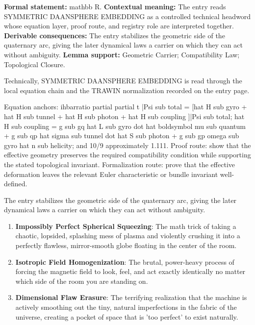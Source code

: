 \begingroup\footnotesize\setlength{\emergencystretch}{3em}\sloppy
\textbf{Formal statement:} mathbb R. \textbf{Contextual meaning:} The entry reads SYMMETRIC DAANSPHERE EMBEDDING as a controlled technical headword whose equation layer, proof route, and registry role are interpreted together. \textbf{Derivable consequences:} The entry stabilizes the geometric side of the quaternary arc, giving the later dynamical laws a carrier on which they can act without ambiguity. \textbf{Lemma support:} Geometric Carrier; Compatibility Law; Topological Closure.\par
\endgroup

Technically, SYMMETRIC DAANSPHERE EMBEDDING is read through the local equation chain and the TRAWIN normalization recorded on the entry page.

Equation anchors: ihbarratio partial partial t |Psi sub total = [hat H sub gyro + hat H sub tunnel + hat H sub photon + hat H sub coupling ]|Psi sub total; hat H sub coupling = g sub gq hat L sub gyro dot hat boldsymbol mu sub quantum + g sub qp hat sigma sub tunnel dot hat S sub photon + g sub gp omega sub gyro hat n sub helicity; and 10/9 approximately 1.111. Proof route: show that the effective geometry preserves the required compatibility condition while supporting the stated topological invariant. Formalization route: prove that the effective deformation leaves the relevant Euler characteristic or bundle invariant well-defined.

The entry stabilizes the geometric side of the quaternary arc, giving the later dynamical laws a carrier on which they can act without ambiguity.
\endgroup

\begin{enumerate}[leftmargin=1.6em,itemsep=6pt,topsep=4pt]
\item \textbf{Impossibly Perfect Spherical Squeezing}: The math trick of taking a chaotic, lopsided, splashing mess of plasma and violently crushing it into a perfectly flawless, mirror-smooth globe floating in the center of the room.
\item \textbf{Isotropic Field Homogenization}: The brutal, power-heavy process of forcing the magnetic field to look, feel, and act exactly identically no matter which side of the room you are standing on.
\item \textbf{Dimensional Flaw Erasure}: The terrifying realization that the machine is actively smoothing out the tiny, natural imperfections in the fabric of the universe, creating a pocket of space that is 'too perfect' to exist naturally.
\end{enumerate}

